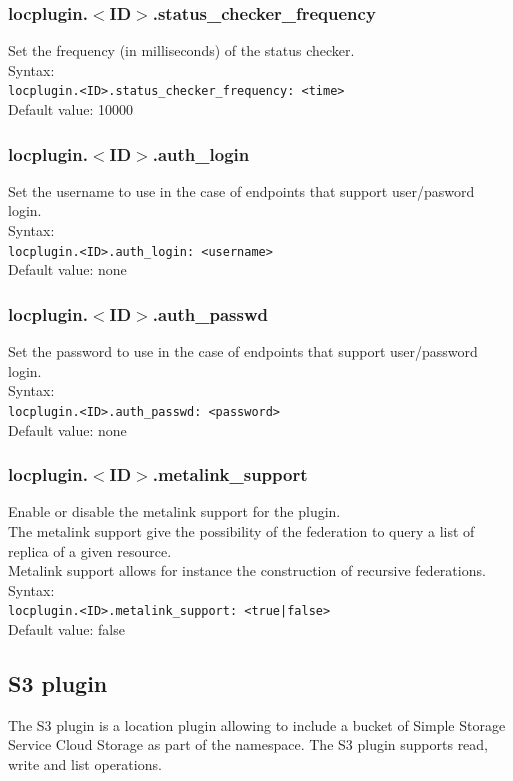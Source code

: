 \documentclass[12pt]{article} %
\begin{document}
\subsubsection{locplugin.$<$ID$>$.status\_checker\_frequency}
Set the frequency (in milliseconds) of the status checker.\\
Syntax:\\
\lstinline"locplugin.<ID>.status_checker_frequency: <time>"\\
Default value: 10000\\
\subsubsection{locplugin.$<$ID$>$.auth\_login}
Set the username to use in the case of endpoints that support user/pasword login.\\
Syntax:\\
\lstinline"locplugin.<ID>.auth_login: <username>"\\
Default value: none\\
\subsubsection{locplugin.$<$ID$>$.auth\_passwd}
Set the password to use in the case of endpoints that support user/password login.\\
Syntax:\\
\lstinline"locplugin.<ID>.auth_passwd: <password>"\\
Default value: none\\
\subsubsection{locplugin.$<$ID$>$.metalink\_support}
Enable or disable the metalink support for the plugin. \\
The metalink support give the possibility of the federation to query a list of replica of a given resource. \\
Metalink support allows for instance the construction of recursive federations.  \\
Syntax:\\
\lstinline"locplugin.<ID>.metalink_support: <true|false>"\\
Default value: false \\

\subsection{S3 plugin}
The S3 plugin is a location plugin allowing to include a bucket of Simple Storage Service Cloud Storage as part of the namespace. The S3 plugin supports read, write and list operations.
\end{document}
